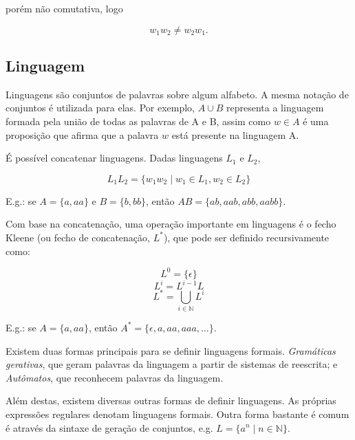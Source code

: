 \documentclass[a4paper,12pt,oneside,onecolumn]{uerj}
\begin{document}
porém não comutativa, logo

\begin{equation*}
w_1w_2 \neq w_2w_1.
\end{equation*}

\subsection{Linguagem}

Linguagens são conjuntos de palavras sobre algum alfabeto. A mesma notação de conjuntos é utilizada para elas. Por exemplo, $A \cup B$ representa a linguagem formada pela união de todas as palavras de A e B, assim como $w \in A$ é uma proposição que afirma que a palavra $w$ está presente na linguagem A.

É possível concatenar linguagens. Dadas linguagens $L_1$ e $L_2$,

\begin{equation*}
	L_1L_2 = \{w_1w_2 \mid w_1 \in L_1, w_2 \in L_2\}
\end{equation*}

E.g.: se $A = \{a, aa\}$ e $B = \{b, bb\}$, então $AB = \{ab, aab, abb, aabb\}$.


Com base na concatenação, uma operação importante em linguagens é o fecho Kleene (ou fecho de concatenação, $L^*$), que pode ser definido recursivamente como:

\begin{equation*}
	L^0 = \{\epsilon\}
\end{equation*}
\begin{equation*}
	L^i = L^{i-1}L
\end{equation*}
\begin{equation*}
	L^* = \bigcup_{i \in \mathbb{N}} L^i
\end{equation*}

E.g.: se $A = \{a, aa\}$, então $A^* = \{\epsilon, a, aa, aaa, \ldots\}$.

Existem duas formas principais para se definir linguagens formais. \emph{Gramáticas gerativas}, que geram palavras da linguagem a partir de sistemas de reescrita; e \emph{Autômatos}, que reconhecem palavras da linguagem. 

Além destas, existem diversas outras formas de definir linguagens. As próprias expressões regulares denotam linguagens formais. Outra forma bastante é comum é através da sintaxe de geração de conjuntos, e.g. $L=\{a^n \mid n \in \mathbb{N}\}$.

\end{document}

